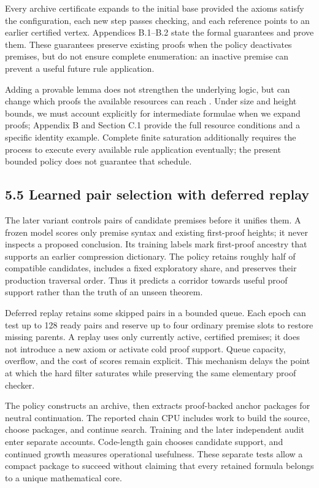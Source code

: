 \documentclass[pdflatex,sn-basic,Numbered]{sn-jnl}
\begin{document}
Every archive certificate expands to the initial base provided the axioms satisfy the configuration, each new step passes checking, and each reference points to an earlier certified vertex. Appendices B.1--B.2 state the formal guarantees and prove them. These guarantees preserve existing proofs when the policy deactivates premises, but do not ensure complete enumeration: an inactive premise can prevent a useful future rule application.

Adding a provable lemma does not strengthen the underlying logic, but can change which proofs the available resources can reach \citep{CookReckhow1979}. Under size and height bounds, we must account explicitly for intermediate formulae when we expand proofs; Appendix B and Section C.1 provide the full resource conditions and a specific identity example. Complete finite saturation additionally requires the process to execute every available rule application eventually; the present bounded policy does not guarantee that schedule.

\subsection*{5.5 Learned pair selection with deferred replay}\label{learned-pair-selection-with-deferred-replay}

The later variant controls pairs of candidate premises before it unifies them. A frozen model scores only premise syntax and existing first-proof heights; it never inspects a proposed conclusion. Its training labels mark first-proof ancestry that supports an earlier compression dictionary. The policy retains roughly half of compatible candidates, includes a fixed exploratory share, and preserves their production traversal order. Thus it predicts a corridor towards useful proof support rather than the truth of an unseen theorem.

Deferred replay retains some skipped pairs in a bounded queue. Each epoch can test up to 128 ready pairs and reserve up to four ordinary premise slots to restore missing parents. A replay uses only currently active, certified premises; it does not introduce a new axiom or activate cold proof support. Queue capacity, overflow, and the cost of scores remain explicit. This mechanism delays the point at which the hard filter saturates while preserving the same elementary proof checker.

The policy constructs an archive, then extracts proof-backed anchor packages for neutral continuation. The reported chain CPU includes work to build the source, choose packages, and continue search. Training and the later independent audit enter separate accounts. Code-length gain chooses candidate support, and continued growth measures operational usefulness. These separate tests allow a compact package to succeed without claiming that every retained formula belongs to a unique mathematical core.
\end{document}
